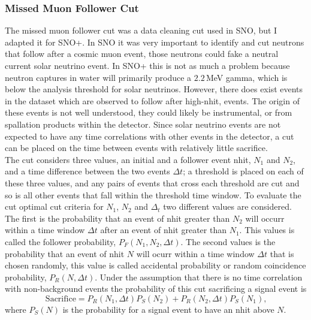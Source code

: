 \subsubsection{Missed Muon Follower Cut}
The missed muon follower cut was a data cleaning cut used in SNO, but I adapted
it for SNO+.
In SNO it was very important to identify and cut neutrons that follow
after a cosmic muon event, those neutrons could fake
a neutral current solar neutrino event.
In SNO+ this is not as much a problem because neutron captures in water will
primarily produce a $2.2$\,MeV gamma, which is below the analysis threshold for
solar neutrinos.
However, there does exist events in the dataset which are observed to follow
after high-nhit, events. The origin of these events is not well understood, they
could likely be instrumental, or from  spallation products within the detector.
Since solar neutrino events are not expected to have any time correlations
with other events in the detector, a cut can be placed on the time between
events with relatively little sacrifice.\\

The cut considers three values, an initial and a follower event nhit, $N_{1}$
and $N_{2}$, and a time difference between the two events $\Delta t$;
a threshold is placed on each of these three values, and any pairs of events that cross
each threshold are cut and so is all other events that fall within the threshold
time window.
To evaluate the cut optimal cut criteria for $N_{1}$, $N_{2}$ and $\Delta_{t}$
two different values are considered.
The first is the probability that an event of nhit greater than $N_{2}$ will occurr within a time
window $\Delta t$ after an event of nhit greater than $N_{1}$.
This values is called the follower probability, $P_{F}(N_{1}, N_{2}, \Delta t)$.
The second values is the probability that an event of nhit $N$ will ocurr
within a time window $\Delta t$ that is chosen randomly, this value
is called accidental probability or random coincidence probability, $P_{R}(N, \Delta t)$.
Under the assumption that there is no time correlation with non-background
events the probability of this cut sacrificing a signal event is
\begin{equation}
    \mathrm{Sacrifice} = P_{R}(N_{1},\Delta t)P_{S}(N_{2}) + P_{R}(N_{2}, \Delta t)P_{S}(N_{1})\text{,}
\end{equation}
where $P_{S}(N)$ is the probability for a signal event to have an nhit above
$N$.

